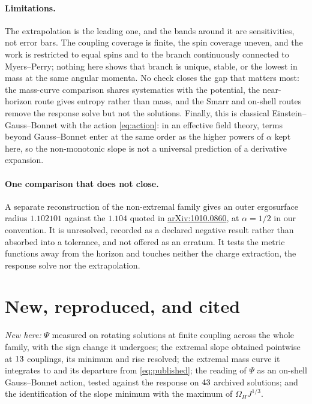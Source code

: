 \documentclass[10pt,a4paper]{article}
\newcommand{\aX}[1]{\href{https://arxiv.org/abs/#1}{arXiv:#1}}
\begin{document}
\paragraph{Limitations.}
The extrapolation is the leading one, and the bands around it are
sensitivities, not error bars. The coupling coverage is finite, the spin
coverage uneven, and the work is restricted to equal spins and to the branch
continuously connected to Myers--Perry; nothing here shows that branch is
unique, stable, or the lowest in mass at the same angular momenta. No check
closes the gap that matters most: the mass-curve comparison shares systematics
with the potential, the near-horizon route gives entropy rather than mass, and
the Smarr and on-shell routes remove the response solve but not the solutions.
Finally, this is classical Einstein--Gauss--Bonnet with the action
\eqref{eq:action}: in an effective field theory, terms beyond Gauss--Bonnet
enter at the same order as the higher powers of $\alpha$ kept here, so the
non-monotonic slope is not a universal prediction of a derivative expansion.

\paragraph{One comparison that does not close.}
A separate reconstruction of the non-extremal family gives an outer ergosurface
radius $1.102101$ against the $1.104$ quoted in \aX{1010.0860}, at $\alpha=1/2$
in our convention. It is unresolved, recorded as a declared negative result
rather than absorbed into a tolerance, and not offered as an erratum. It tests
the metric functions away from the horizon and touches neither the charge
extraction, the response solve nor the extrapolation.

\section*{New, reproduced, and cited}

\emph{New here:} $\Psi$ measured on rotating solutions at finite coupling across
the whole family, with the sign change it undergoes; the extremal slope obtained
pointwise at $13$ couplings, its minimum and rise resolved; the extremal
mass curve it integrates to and its departure from \eqref{eq:published}; the
reading of $\Psi$ as an on-shell Gauss--Bonnet action, tested against the
response on $43$ archived solutions; and the identification of the
slope minimum with the maximum of $\Omega_HJ^{1/3}$.
\end{document}
